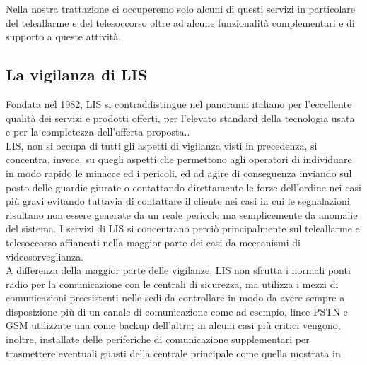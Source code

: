 Nella nostra trattazione ci occuperemo solo alcuni di questi servizi in particolare del teleallarme e del telesoccorso oltre ad alcune funzionalità complementari e di supporto a queste attività.
\subsection{La vigilanza di LIS}
Fondata nel 1982, LIS si contraddistingue nel panorama italiano per l'eccellente qualità dei servizi e prodotti offerti, per l'elevato standard della tecnologia usata e per la completezza dell'offerta proposta.\cite{lis:chisiamo}.\\
LIS, non si occupa di tutti gli aspetti di vigilanza visti in precedenza, si concentra, invece, su quegli aspetti che permettono agli operatori di individuare in modo rapido le minacce ed i pericoli, ed ad agire di conseguenza inviando sul posto delle guardie giurate o contattando direttamente le forze dell'ordine nei casi più gravi evitando tuttavia di contattare il cliente nei casi in cui le segnalazioni risultano non essere generate da un reale pericolo ma semplicemente da anomalie del sistema.
I servizi di LIS si concentrano perciò principalmente sul teleallarme e telesoccorso affiancati nella maggior parte dei casi da meccanismi di videosorveglianza.\\ 
A differenza della maggior parte delle vigilanze, LIS non sfrutta i normali ponti  radio per la comunicazione con le centrali di sicurezza, ma utilizza i mezzi di comunicazioni preesistenti nelle sedi da controllare in modo da avere sempre a disposizione più di un canale di comunicazione come ad esempio, linee PSTN e GSM utilizzate una come backup dell'altra; in alcuni casi più critici vengono, inoltre, installate delle periferiche di comunicazione supplementari per trasmettere eventuali guasti della centrale principale come quella mostrata in 

